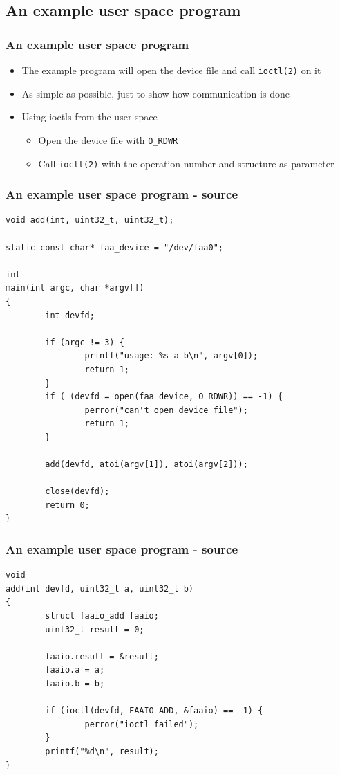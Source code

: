 \documentclass[dvipsnames,table]{beamer}
\begin{document}
\subsection{An example user space program}

\begin{frame}
\frametitle{An example user space program}
\begin{itemize}
	\item The example program will open the device file and call {\tt ioctl(2)} on it
	\item As simple as possible, just to show how communication is done
	\item Using ioctls from the user space
	\begin{itemize}
		\item Open the device file with {\tt O\_RDWR}
		\item Call {\tt ioctl(2)} with the operation number and structure as parameter
	\end{itemize}
\end{itemize}
\end{frame}

\begin{frame}[fragile]
\frametitle{An example user space program - source}
\begin{lstlisting}
void add(int, uint32_t, uint32_t);

static const char* faa_device = "/dev/faa0";

int
main(int argc, char *argv[])
{
        int devfd;

        if (argc != 3) {
                printf("usage: %s a b\n", argv[0]);
                return 1;
        }
        if ( (devfd = open(faa_device, O_RDWR)) == -1) {
                perror("can't open device file");
                return 1;
        }

        add(devfd, atoi(argv[1]), atoi(argv[2]));

        close(devfd);
        return 0;
}
\end{lstlisting}
\end{frame}

\begin{frame}[fragile]
\frametitle{An example user space program - source}
\begin{lstlisting}
void
add(int devfd, uint32_t a, uint32_t b)
{
        struct faaio_add faaio;
        uint32_t result = 0;

        faaio.result = &result;
        faaio.a = a;
        faaio.b = b;

        if (ioctl(devfd, FAAIO_ADD, &faaio) == -1) {
                perror("ioctl failed");
        }
        printf("%d\n", result);
}
\end{lstlisting}
\end{frame}
\end{document}
